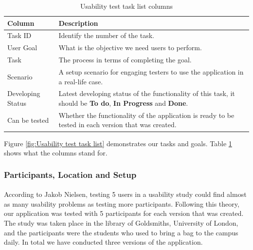 \documentclass[12pt,a4paper]{article}
\begin{document}
            \begin{table}[H]
              \centering
                \begin{tabularx}{\textwidth}{l X}
                  \hline
                  Column & Description  \\ \hline
                  Task ID & Identify the number of the task.  \\ 
                  User Goal & What is the objective we need users to perform.  \\ 
                  Task & The process in terms of completing the goal.  \\ 
                  Scenario & A setup scenario for engaging testers to use the application in a real-life case.   \\ 
                  Developing Status & Latest developing status of the functionality of this task, it should be {\bf To do}, {\bf In Progress} and {\bf Done}.\\ 
                  Can be tested &  Whether the functionality of the application is ready to be tested in each version that was created.\\ 
                  \hline
                \end{tabularx}
                \caption[Table caption text]{Usability test task list columns}
                \label{table:Usability test task list columns}
            \end{table}

            Figure \ref{fig:Usability test task list} demonstrates our tasks and goals. Table \ref{table:Usability test task list columns} shows what the columns stand for.

        \subsubsection{Participants, Location and Setup}
          \paragraph{} According to Jakob Nielsen, testing 5 users in a usability study could find almost as many usability problems as testing more participants\cite{HowManyTestUsers}. Following this theory, our application was tested with 5 participants for each version that was created. The study was taken place in the library of Goldsmiths, University of London, and the participants were the students who used to bring a bag to the campus daily. In total we have conducted three versions of the application.
          
\end{document}
